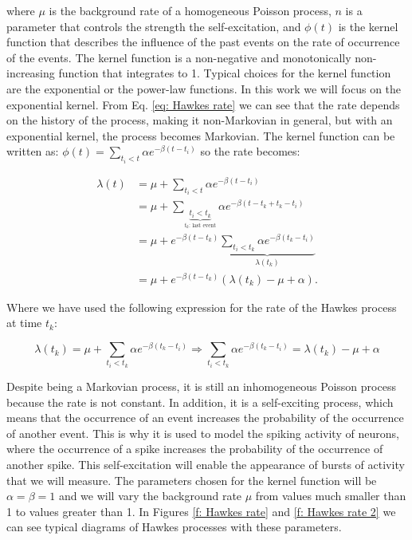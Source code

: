 where $\mu$ is the background rate of a homogeneous Poisson process, $n$ is a parameter that controls the strength the self-excitation, and $\phi(t)$ is the kernel function that
describes the influence of the past events on the rate of occurrence of the events. The kernel function is a non-negative and monotonically non-increasing function that integrates to 1.
Typical choices for the kernel function are the exponential or the power-law functions. In this work we will focus on the exponential kernel. 
From Eq. \ref{eq: Hawkes rate} we can see that the rate depends on the history of the process, making it non-Markovian in general, but with an exponential kernel, the process becomes
Markovian. The kernel function can be written as: $\phi(t)=\sum_{t_i<t}\alpha e^{-\beta(t-t_i)}$ so the rate becomes:

\begin{equation}
    \begin{split}
        \lambda(t) &= \mu + \sum_{t_i<t}\alpha e^{-\beta(t-t_i)}\\
        &= \mu + \sum_{\underbrace{t_i<t_k}_{t_k\text{: last event}}}\alpha e^{-\beta(t-t_k+t_k-t_i)}\\
        &= \mu + e^{-\beta(t-t_k)}\underbrace{\sum_{t_i<t_k}\alpha e^{-\beta(t_k-t_i)}}_{\lambda(t_k)}\\
        &= \mu + e^{-\beta(t-t_k)}\left( \lambda(t_k)-\mu+\alpha \right).
    \end{split}
    \label{eq: Hawkes rate exponential becomes Markovian}
\end{equation}

Where we have used the following expression for the rate of the Hawkes process at time $t_k$:

\begin{equation}
    \lambda(t_k) =\mu+\sum_{t_i<t_k}\alpha e^{-\beta(t_k-t_i)}\Rightarrow\sum_{t_i<t_k}\alpha e^{-\beta(t_k-t_i)} = \lambda(t_k)-\mu+\alpha
    \label{eq: Hawkes rate at event time}
\end{equation}

Despite being a Markovian process, it is still an inhomogeneous Poisson process because the rate is not constant. In addition, it is a self-exciting process, which means that the occurrence
of an event increases the probability of the occurrence of another event. This is why it is used to model the spiking activity of neurons, where the occurrence of a spike increases the
probability of the occurrence of another spike. This self-excitation will enable the appearance of bursts of activity that we will measure. The parameters chosen for the kernel function 
will be $\alpha=\beta=1$ and we will vary the background rate $\mu$ from values much smaller than 1 to values greater than 1. In Figures \ref{f: Hawkes rate} and \ref{f: Hawkes rate 2}
we can see typical diagrams of Hawkes processes with these parameters.

